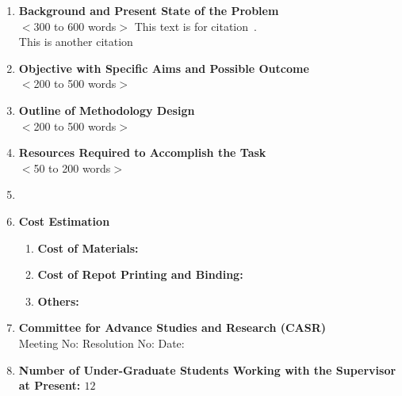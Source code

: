 \documentclass[11pt,a4paper]{article}
\begin{document}
\begin{enumerate}
\item \textbf{Background and Present State of the Problem}\\
$<$300 to 600 words$>$
This text is for citation~\cite{sadek2019parkinson}.\\
This is another citation~\cite{sriram2013intelligent}

\item \textbf{Objective with Specific Aims and Possible Outcome} \\
$<$200 to 500 words$>$

\item \textbf{Outline of Methodology Design}\\
$<$200 to 500 words$>$


\item \textbf{Resources Required to Accomplish the Task}\\
$<$50 to 200 words$>$

\item 




\item \textbf{Cost Estimation}
\begin{enumerate}
    \item \textbf{Cost of Materials:}
    \item \textbf{Cost of Repot Printing and Binding:}
    \item \textbf{Others:}
\end{enumerate}



\item \textbf{Committee for Advance Studies and Research (CASR) }\\
Meeting No:\hspace{3cm} Resolution No:\hspace{3cm} Date:\hspace{3cm}\\
\item \textbf{Number of Under-Graduate Students Working with the Supervisor at Present: $12$}


\end{enumerate}
\end{document}
